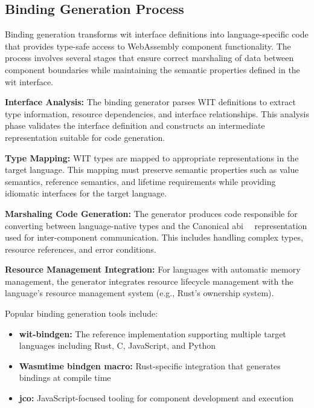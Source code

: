 \subsection{Binding Generation Process}
\label{subsec:binding-generation}

Binding generation transforms \acrshort{wit} interface definitions into language-specific code that provides type-safe access to WebAssembly component functionality. The process involves several stages that ensure correct marshaling of data between component boundaries while maintaining the semantic properties defined in the \acrshort{wit} interface.

\textbf{Interface Analysis:} The binding generator parses WIT definitions to extract type information, resource dependencies, and interface relationships. This analysis phase validates the interface definition and constructs an intermediate representation suitable for code generation.

\textbf{Type Mapping:} WIT types are mapped to appropriate representations in the target language. This mapping must preserve semantic properties such as value semantics, reference semantics, and lifetime requirements while providing idiomatic interfaces for the target language.

\textbf{Marshaling Code Generation:} The generator produces code responsible for converting between language-native types and the Canonical \acrfull{abi}~\cite{abi}~\cite{cabi} representation used for inter-component communication. This includes handling complex types, resource references, and error conditions.

\textbf{Resource Management Integration:} For languages with automatic memory management, the generator integrates resource lifecycle management with the language's resource management system (e.g., Rust's ownership system).

Popular binding generation tools include:

\begin{itemize}
    \item \textbf{wit-bindgen:} The reference implementation supporting multiple target languages including Rust, C, JavaScript, and Python~\cite{wit_bindgen_git}
    \item \textbf{Wasmtime bindgen macro:} Rust-specific integration that generates bindings at compile time~\cite{wasmtime_bindgen_docs}
    \item \textbf{jco:} JavaScript-focused tooling for component development and execution~\cite{jco_docs}
\end{itemize}

